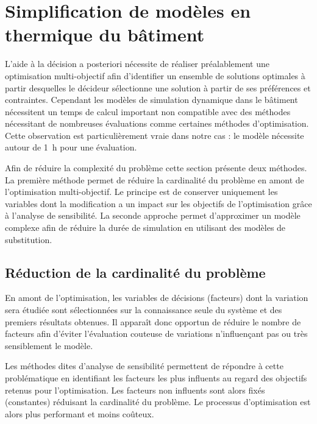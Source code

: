 \section{Simplification de modèles en thermique du bâtiment} %
\label{sec:simplification_de_modeles_en_thermique_du_batiment}
L’aide à la décision a posteriori nécessite de réaliser préalablement une optimisation
multi-objectif afin d’identifier un ensemble de solutions optimales à partir desquelles le
décideur sélectionne une solution à partir de ses préférences et contraintes.
Cependant les modèles de simulation dynamique dans le bâtiment nécessitent un temps de calcul
important non compatible avec des méthodes nécessitant de nombreuses évaluations comme
certaines méthodes d’optimisation. Cette observation est particulièrement vraie dans notre
cas : le modèle nécessite autour de \SI{1}{h} pour une évaluation.

Afin de réduire la complexité du problème cette section présente deux méthodes.
La première méthode permet de réduire la cardinalité du problème en amont de
l’optimisation multi-objectif. Le principe est de conserver uniquement les variables
dont la modification a un impact sur les objectifs de l’optimisation grâce à l’analyse de
sensibilité. La seconde approche permet d’approximer un modèle complexe afin de réduire la
durée de simulation en utilisant des modèles de substitution.


\subsection{Réduction de la cardinalité du problème} %
\label{sub:reduction_de_la_cardinalite_du_probleme}
En amont de l’optimisation, les variables de décisions (facteurs) dont la variation sera
étudiée sont sélectionnées sur la connaissance seule du système et des premiers résultats
obtenues. Il apparaît donc opportun de réduire le nombre de facteurs afin d’éviter
l’évaluation couteuse de variations n’influençant pas ou très sensiblement le modèle.

Les méthodes dites d’analyse de sensibilité permettent de répondre à cette problématique
en identifiant les facteurs les plus influents au regard des objectifs retenus pour
l’optimisation. Les facteurs non influents sont alors fixés (constantes) réduisant la
cardinalité du problème. Le processus d’optimisation est alors plus performant et moins
coûteux.

